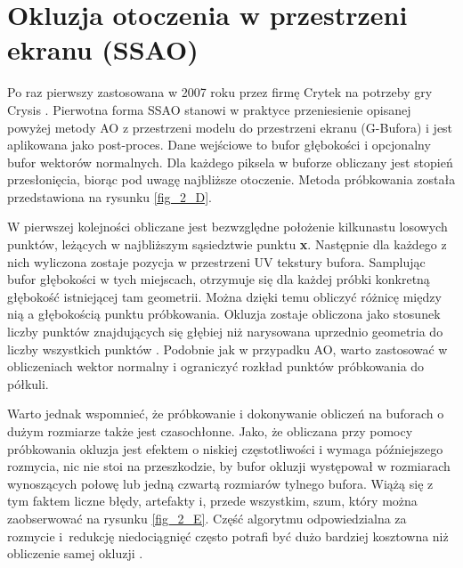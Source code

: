 	
	\section{Okluzja otoczenia w przestrzeni ekranu (SSAO)}
	\label{t:teoria:ssao}
	
	Po raz pierwszy zastosowana w 2007 roku przez firmę Crytek na potrzeby gry Crysis \cite{crytek}. Pierwotna forma SSAO stanowi w praktyce przeniesienie opisanej powyżej metody AO z przestrzeni modelu do przestrzeni ekranu (G-Bufora) i jest aplikowana jako post-proces. Dane wejściowe to bufor głębokości i opcjonalny bufor wektorów normalnych. Dla każdego piksela w buforze obliczany jest stopień przesłonięcia, biorąc pod uwagę najbliższe otoczenie. Metoda próbkowania została przedstawiona na rysunku \ref{fig_2_D}.
	
	
	W pierwszej kolejności obliczane jest bezwzględne położenie kilkunastu losowych punktów, leżących w najbliższym sąsiedztwie punktu \textbf{x}. Następnie dla każdego z nich wyliczona zostaje pozycja w przestrzeni UV tekstury bufora. Samplując bufor głębokości w tych miejscach, otrzymuje się dla każdej próbki konkretną głębokość istniejącej tam geometrii. Można dzięki temu obliczyć różnicę między nią a głębokością punktu próbkowania. Okluzja zostaje obliczona jako stosunek liczby punktów znajdujących się głębiej niż narysowana uprzednio geometria do liczby wszystkich punktów \cite{luna}. Podobnie jak w przypadku AO, warto zastosować w obliczeniach wektor normalny i ograniczyć rozkład punktów próbkowania do półkuli.
	
	
	
	Warto jednak wspomnieć, że próbkowanie i dokonywanie obliczeń na buforach o dużym rozmiarze także jest czasochłonne. Jako, że obliczana przy pomocy próbkowania okluzja jest efektem o niskiej częstotliwości i wymaga późniejszego rozmycia, nic nie stoi na przeszkodzie, by bufor okluzji występował w rozmiarach wynoszących połowę lub jedną czwartą rozmiarów tylnego bufora. Wiążą się z tym faktem liczne błędy, artefakty i, przede wszystkim, szum, który można zaobserwować na rysunku \ref{fig_2_E}. Część algorytmu odpowiedzialna za rozmycie i~redukcję niedociągnięć często potrafi być dużo bardziej kosztowna niż obliczenie samej okluzji \cite{statvo}.
	
